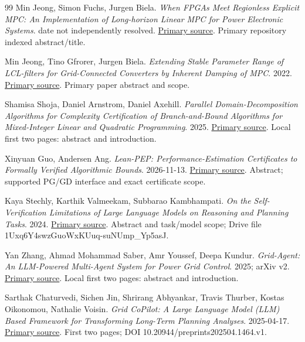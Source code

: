 \documentclass[11pt,letterpaper]{article}
\begin{document}
\begin{thebibliography}{99}
 Min Jeong, Simon Fuchs, Jurgen Biela. \emph{When FPGAs Meet Regionless Explicit MPC: An Implementation of Long-horizon Linear MPC for Power Electronic Systems}. date not independently resolved. \href{https://www.research-collection.ethz.ch/server/api/core/bitstreams/c293d2db-8673-4ddc-ba71-1dd3afa0cff2/content}{Primary source}. Primary repository indexed abstract/title.

 Min Jeong, Tino Gfrorer, Jurgen Biela. \emph{Extending Stable Parameter Range of LCL-filters for Grid-Connected Converters by Inherent Damping of MPC}. 2022. \href{https://www.research-collection.ethz.ch/bitstream/handle/20.500.11850/564410/3/LCL_filter_MPC_COMPEL2022_final_submission.pdf}{Primary source}. Primary paper abstract and scope.

 Shamisa Shoja, Daniel Arnstrom, Daniel Axehill. \emph{Parallel Domain-Decomposition Algorithms for Complexity Certification of Branch-and-Bound Algorithms for Mixed-Integer Linear and Quadratic Programming}. 2025. \href{https://arxiv.org/abs/2503.16411}{Primary source}. Local first two pages: abstract and introduction.

 Xinyuan Guo, Andersen Ang. \emph{Lean-PEP: Performance-Estimation Certificates to Formally Verified Algorithmic Bounds}. 2026-11-13. \href{https://arxiv.org/abs/2611.17618}{Primary source}. Abstract; supported PG/GD interface and exact certificate scope.

 Kaya Stechly, Karthik Valmeekam, Subbarao Kambhampati. \emph{On the Self-Verification Limitations of Large Language Models on Reasoning and Planning Tasks}. 2024. \href{https://arxiv.org/abs/2402.08115}{Primary source}. Abstract and task/model scope; Drive file 1Uxq6Y4swzGuoWxKUuq-suNUmp\_Yp5asJ.

 Yan Zhang, Ahmad Mohammad Saber, Amr Youssef, Deepa Kundur. \emph{Grid-Agent: An LLM-Powered Multi-Agent System for Power Grid Control}. 2025; arXiv v2. \href{https://arxiv.org/abs/2508.05702}{Primary source}. Local first two pages: abstract and introduction.

 Sarthak Chaturvedi, Sichen Jin, Shrirang Abhyankar, Travis Thurber, Kostas Oikonomou, Nathalie Voisin. \emph{Grid CoPilot: A Large Language Model (LLM) Based Framework for Transforming Long-Term Planning Analyses}. 2025-04-17. \href{https://www.preprints.org/manuscript/202504.1464}{Primary source}. First two pages; DOI 10.20944/preprints202504.1464.v1.


\end{thebibliography}
\end{document}
